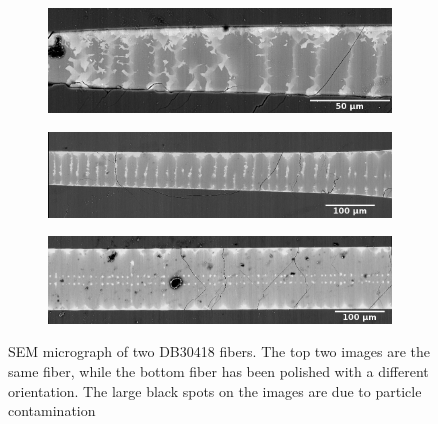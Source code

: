 \begin{figure}[h]
\centering
\begin{subfigure}{\textwidth}
  \centering
  \includegraphics[width=\linewidth]{fig/Results/DB30418_contrast3.png}
  \label{fig:sfig1}
\end{subfigure}%

\begin{subfigure}{\textwidth}
  \centering
  \includegraphics[width=\linewidth]{fig/Results/DB30418_contrast1.png}
  \label{fig:sfig2}
\end{subfigure}%

\begin{subfigure}{\textwidth}
  \centering
  \includegraphics[width=\linewidth]{fig/Results/DB30418_contrast2.png}
  \label{fig:sfig3}
\end{subfigure}
\caption{SEM micrograph of two DB30418 fibers. The top two images are the same fiber, while the bottom fiber has been polished with a different orientation. The large black spots on the images are due to particle contamination }
\label{sige_contrast}
\end{figure}

